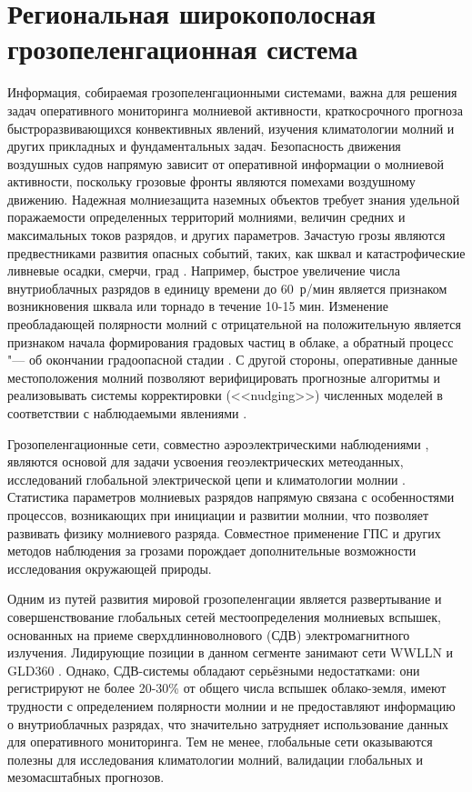 
\chapter{Региональная широкополосная грозопеленгационная система}
\label{sec:lds-intro}
Информация, собираемая грозопеленгационными системами, важна для решения задач оперативного мониторинга молниевой активности, краткосрочного прогноза быстроразвивающихся конвективных явлений, изучения климатологии молний и других прикладных и фундаментальных задач. Безопасность движения воздушных судов напрямую зависит от оперативной информации о молниевой активности, поскольку грозовые фронты являются помехами воздушному движению. Надежная молниезащита наземных объектов требует знания удельной поражаемости определенных территорий молниями, величин средних и максимальных токов разрядов, и других параметров. Зачастую грозы являются предвестниками развития опасных событий, таких, как шквал и катастрофические ливневые осадки, смерчи, град \cite{Matveev1984}. Например, быстрое увеличение числа внутриоблачных разрядов в единицу времени до 60~р/мин является признаком возникновения шквала или торнадо в течение 10-15 мин. Изменение преобладающей полярности молний с отрицательной на положительную является признаком начала формирования градовых частиц в облаке, а обратный процесс "--- об окончании градоопасной стадии \cite{Matveev1984}. С другой стороны, оперативные данные местоположения молний позволяют верифицировать прогнозные алгоритмы и реализовывать системы корректировки (<<nudging>>) численных моделей в соответствии с наблюдаемыми явлениями \cite{Huang2009}. 

Грозопеленгационные сети, совместно аэроэлектрическими наблюдениями \cite{Anisimov2013}, являются основой для задачи усвоения геоэлектрических метеоданных, исследований глобальной электрической цепи и климатологии молнии \cite{Mareev2010,Williams2014}. Статистика параметров молниевых разрядов напрямую связана с особенностями процессов, возникающих при инициации и развитии молнии, что позволяет развивать физику молниевого разряда. Совместное применение ГПС и других методов наблюдения за грозами порождает дополнительные возможности исследования окружающей природы.

Одним из путей развития мировой грозопеленгации является развертывание и совершенствование глобальных сетей местоопределения молниевых вспышек, основанных на приеме сверхдлинноволнового (СДВ) электромагнитного излучения. Лидирующие позиции в данном сегменте занимают сети WWLLN \cite{wwllnSite} и GLD360 \cite{gld360Site}. Однако, СДВ-системы обладают серьёзными недостатками: они регистрируют не более 20-30\% от общего числа вспышек облако-земля, имеют трудности с определением полярности молнии и не предоставляют информацию о внутриоблачных разрядах, что значительно затрудняет использование данных для оперативного мониторинга. Тем не менее, глобальные сети оказываются полезны для исследования климатологии молний, валидации глобальных и мезомасштабных прогнозов.

